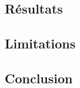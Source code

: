 \documentclass[letterpaper,12pt]{article}
\begin{document}
\subsection{Résultats}



\clearpage

 
\subsection{Limitations}


\clearpage

\subsection{Conclusion}


\clearpage




\end{document}
